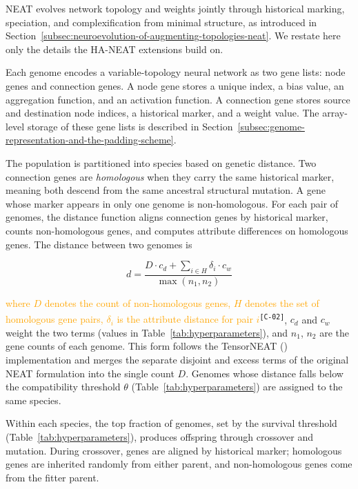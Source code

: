 \documentclass[12pt]{article}
\newcommand{\revID}[1]{\textsuperscript{\scriptsize\texttt{[#1]}}}
\newcommand{\revWeak}[2]{\textcolor{orange}{#2}\revID{#1}}    %
\begin{document}
NEAT evolves network topology and weights jointly through historical marking, speciation, and complexification from minimal structure, as introduced in Section~\ref{subsec:neuroevolution-of-augmenting-topologies-neat}.
We restate here only the details the HA-NEAT extensions build on.

Each genome encodes a variable-topology neural network as two gene lists: node genes and connection genes.
A node gene stores a unique index, a bias value, an aggregation function, and an activation function.
A connection gene stores source and destination node indices, a historical marker, and a weight value.
The array-level storage of these gene lists is described in Section~\ref{subsec:genome-representation-and-the-padding-scheme}.

The population is partitioned into species based on genetic distance.
Two connection genes are \emph{homologous} when they carry the same historical marker, meaning both descend from the same ancestral structural mutation. A gene whose marker appears in only one genome is non-homologous.
For each pair of genomes, the distance function aligns connection genes by historical marker, counts non-homologous genes, and computes attribute differences on homologous genes.
The distance between two genomes is

\[d = \frac{D \cdot c_d + \sum_{i \in H} \delta_i \cdot c_w}{\max(n_1, n_2)}\]

\revWeak{C-02}{where $D$ denotes the count of non-homologous genes, $H$ denotes the set of homologous gene pairs, $\delta_i$ is the attribute distance for pair $i$}, $c_d$ and $c_w$ weight the two terms (values in Table~\ref{tab:hyperparameters}), and $n_1$, $n_2$ are the gene counts of each genome.
This form follows the TensorNEAT (\cite{wang_tensorized_2024}) implementation and merges the separate disjoint and excess terms of the original NEAT formulation into the single count $D$.
Genomes whose distance falls below the compatibility threshold $\theta$ (Table~\ref{tab:hyperparameters}) are assigned to the same species.

Within each species, the top fraction of genomes, set by the survival threshold (Table~\ref{tab:hyperparameters}), produces offspring through crossover and mutation.
During crossover, genes are aligned by historical marker; homologous genes are inherited randomly from either parent, and non-homologous genes come from the fitter parent.

\end{document}
